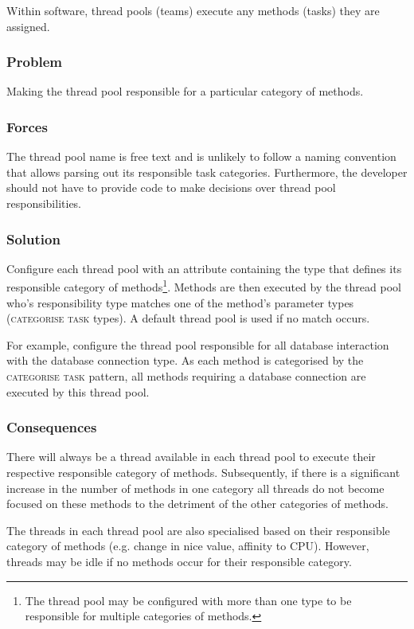 \documentclass[prodmode]{style/acmlarge}
\begin{document}
Within software, thread pools (teams) execute any methods (tasks) they are
assigned.

\subsubsection*{Problem} Making the thread pool responsible for a particular
category of methods.

\subsubsection*{Forces} The thread pool name is free text and is unlikely to
follow a naming convention that allows parsing out its responsible task
categories.  Furthermore, the developer should not have to provide code to make
decisions over thread pool responsibilities.

\subsubsection*{Solution} Configure each thread pool with an attribute
containing the type that defines its responsible category of
methods\footnote{The thread pool may be configured with more than one type to be
responsible for multiple categories of methods.}. Methods are then executed by
the thread pool who's responsibility type matches one of the method's parameter
types (\textsc{categorise task} types).  A default thread pool is used if no
match occurs.

For example, configure the thread pool responsible for all database interaction
with the database connection type.  As each method is categorised by the
\textsc{categorise task} pattern, all methods requiring a database connection
are executed by this thread pool.

\subsubsection*{Consequences} There will always be a thread available in each
thread pool to execute their respective responsible category of methods. 
Subsequently, if there is a significant increase in the number of methods in one
category all threads do not become focused on these methods to the detriment of
the other categories of methods.

The threads in each thread pool are also specialised based on their responsible
category of methods (e.g. change in nice value, affinity to CPU).  However,
threads may be idle if no methods occur for their responsible category.
\end{document}
